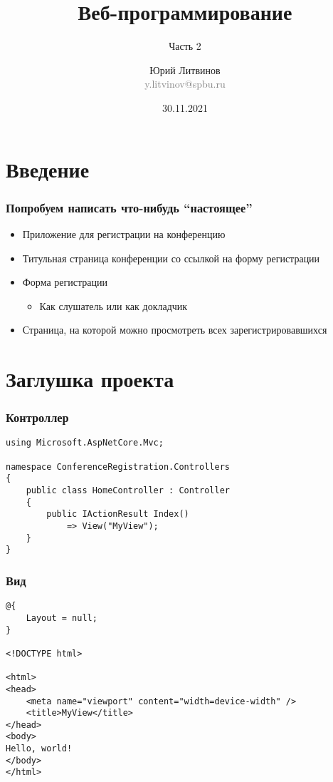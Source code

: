 \documentclass[xetex,mathserif,serif]{beamer}
\title{Веб-программирование}
\subtitle{Часть 2}
\author[Юрий Литвинов]{Юрий Литвинов\\\small{\textcolor{gray}{y.litvinov@spbu.ru}}}
\date{30.11.2021}
\begin{document}
    \frame{\titlepage}

    \section{Введение}

    \begin{frame}
        \frametitle{Попробуем написать что-нибудь ``настоящее''}
        \begin{itemize}
            \item Приложение для регистрации на конференцию
            \item Титульная страница конференции со ссылкой на форму регистрации
            \item Форма регистрации
            \begin{itemize}
                \item Как слушатель или как докладчик
            \end{itemize}
            \item Страница, на которой можно просмотреть всех зарегистрировавшихся
        \end{itemize}
    \end{frame}

    \section{Заглушка проекта}

    \begin{frame}[fragile]
        \frametitle{Контроллер}
        \begin{verbatim}
using Microsoft.AspNetCore.Mvc;

namespace ConferenceRegistration.Controllers
{
    public class HomeController : Controller
    {
        public IActionResult Index()
            => View("MyView");
    }
}
        \end{verbatim}
    \end{frame}

    \begin{frame}[fragile]
        \frametitle{Вид}
        \begin{verbatim}
@{
    Layout = null;
}

<!DOCTYPE html>

<html>
<head>
    <meta name="viewport" content="width=device-width" />
    <title>MyView</title>
</head>
<body>
Hello, world!
</body>
</html>
        \end{verbatim}
    \end{frame}
\end{document}
